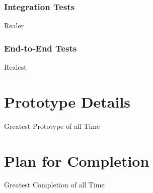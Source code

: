 \documentclass[12pt]{article}
\begin{document}
\subsubsection{Integration Tests}
Realer

\subsubsection{End-to-End Tests}
Realest

\section{Prototype Details}
Greatest Prototype of all Time

\section{Plan for Completion}
Greatest Completion of all Time
\end{document}
